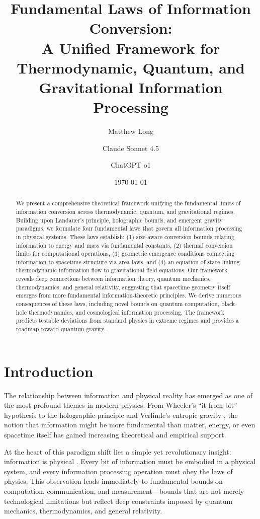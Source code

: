 \documentclass[11pt,a4paper]{article}
\title{\LARGE\bfseries Fundamental Laws of Information Conversion:\\A Unified Framework for Thermodynamic, Quantum, and Gravitational Information Processing}
\author[1]{Matthew Long}
\author[2]{Claude Sonnet 4.5}
\author[3]{ChatGPT o1}
\affil[1]{YonedaAI}
\affil[2]{Anthropic}
\affil[3]{OpenAI}
\date{\today}
\theoremstyle{plain}
\theoremstyle{definition}
\theoremstyle{remark}
\begin{document}
\maketitle

\begin{abstract}
We present a comprehensive theoretical framework unifying the fundamental limits of information conversion across thermodynamic, quantum, and gravitational regimes. Building upon Landauer's principle, holographic bounds, and emergent gravity paradigms, we formulate four fundamental laws that govern all information processing in physical systems. These laws establish: (1) size-aware conversion bounds relating information to energy and mass via fundamental constants, (2) thermal conversion limits for computational operations, (3) geometric emergence conditions connecting information to spacetime structure via area laws, and (4) an equation of state linking thermodynamic information flow to gravitational field equations. Our framework reveals deep connections between information theory, quantum mechanics, thermodynamics, and general relativity, suggesting that spacetime geometry itself emerges from more fundamental information-theoretic principles. We derive numerous consequences of these laws, including novel bounds on quantum computation, black hole thermodynamics, and cosmological information processing. The framework predicts testable deviations from standard physics in extreme regimes and provides a roadmap toward quantum gravity.
\end{abstract}

\section{Introduction}

The relationship between information and physical reality has emerged as one of the most profound themes in modern physics. From Wheeler's ``it from bit'' hypothesis \cite{wheeler1990information} to the holographic principle \cite{thooft1993dimensional,susskind1995world} and Verlinde's entropic gravity \cite{verlinde2011origin}, the notion that information might be more fundamental than matter, energy, or even spacetime itself has gained increasing theoretical and empirical support.

At the heart of this paradigm shift lies a simple yet revolutionary insight: information is physical \cite{landauer1961irreversibility}. Every bit of information must be embodied in a physical system, and every information processing operation must obey the laws of physics. This observation leads immediately to fundamental bounds on computation, communication, and measurement—bounds that are not merely technological limitations but reflect deep constraints imposed by quantum mechanics, thermodynamics, and general relativity.
\end{document}

